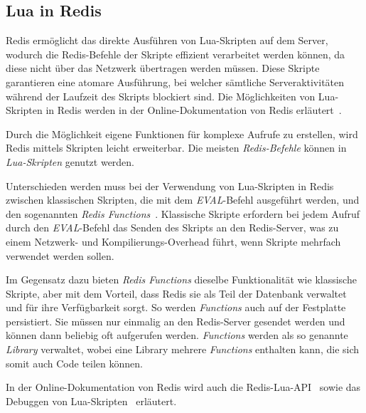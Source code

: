 \subsection{Lua in Redis}
Redis ermöglicht das direkte Ausführen von Lua-Skripten auf dem Server, wodurch die Redis-Befehle der Skripte effizient verarbeitet werden können, da diese nicht über das Netzwerk übertragen werden müssen. Diese Skripte garantieren eine atomare Ausführung, bei welcher sämtliche Serveraktivitäten während der Laufzeit des Skripts blockiert sind. Die Möglichkeiten von Lua-Skripten in Redis werden in der Online-Dokumentation von Redis erläutert~\cite{redis_ltd_scripting_nodate}.

Durch die Möglichkeit eigene Funktionen für komplexe Aufrufe zu erstellen, wird Redis mittels Skripten leicht erweiterbar. Die meisten \emph{Redis-Befehle} können in \emph{Lua-Skripten} genutzt werden.

Unterschieden werden muss bei der Verwendung von Lua-Skripten in Redis zwischen klassischen Skripten, die mit dem \emph{EVAL}-Befehl ausgeführt werden, und den sogenannten \emph{Redis Functions}~\cite{redis_ltd_redis_nodate-1}. Klassische Skripte erfordern bei jedem Aufruf durch den \emph{EVAL}-Befehl das Senden des Skripts an den Redis-Server, was zu einem Netzwerk- und Kompilierungs-Overhead führt, wenn Skripte mehrfach verwendet werden sollen.

Im Gegensatz dazu bieten \emph{Redis Functions} dieselbe Funktionalität wie klassische Skripte, aber mit dem Vorteil, dass Redis sie als Teil der Datenbank verwaltet und für ihre Verfügbarkeit sorgt.  So werden \emph{Functions} auch auf der Festplatte persistiert. Sie müssen nur einmalig an den Redis-Server gesendet werden und können dann beliebig oft aufgerufen werden. \Die \emph{Functions} werden als so genannte \emph{Library} verwaltet, wobei eine Library mehrere \emph{Functions} enthalten kann, die sich somit auch Code teilen können.

In der Online-Dokumentation von Redis wird auch die Redis-Lua-API~\cite{redis_ltd_redis_nodate} sowie das Debuggen von Lua-Skripten~\cite{redis_ltd_debugging_nodate} erläutert.

